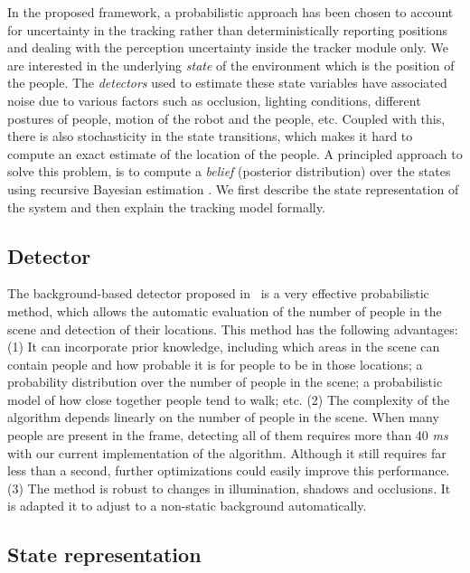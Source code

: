 
In the proposed framework, a probabilistic approach has been chosen to account for uncertainty in the tracking rather than deterministically reporting positions and dealing with the perception uncertainty inside the tracker module only. We are interested in the underlying \textit{state} of the environment which is the position of the people. The \textit{detectors} used to estimate these state variables have associated noise due to various factors such as occlusion, lighting conditions, different postures of people, motion of the robot and the people, etc. Coupled with this, there is also stochasticity in the state transitions, which makes it hard to compute an exact estimate of the location of the people. A principled approach to solve this problem, is to compute a \textit{belief} (posterior distribution) over the states using recursive Bayesian estimation%
. We first describe the state representation of the system and then explain the tracking model formally.

\subsection{Detector}
The background-based detector proposed in~\cite{englebienne-bnaic} is a very effective probabilistic method, which allows the automatic evaluation of the number of people in the scene and detection of their locations. This method has the following advantages: (1) It can incorporate prior knowledge, including which areas in the scene can contain people and how probable it is for people to be in those locations; a probability distribution over the number of people in the scene; a probabilistic model of how close
together people tend to walk; etc. (2) The complexity of the algorithm depends linearly on the number of people in the scene. When many people are present in the frame, detecting all of them requires
more than 40 \textit{ms} with our current implementation of the algorithm. Although it still requires far less than a second, further optimizations could easily improve this performance. (3) The method is robust to changes in illumination, shadows and occlusions. It is adapted it to adjust to a non-static background automatically.

\subsection{State representation}

